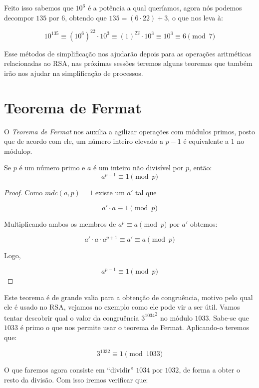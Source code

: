 Feito isso sabemos que $10^6$ \'e a pot\^encia a qual quer\'iamos, agora n\'os podemos decompor $135$ por $6$, obtendo que $135 = (6 \cdot 22) + 3$, o que nos leva \`{a}:

$$10^{135} \equiv (10^6)^{22} \cdot 10^3 \equiv (1)^{22} \cdot 10^3 \equiv 10^3 \equiv 6 \pmod{7}$$

Esse m\'etodos de simplifica\c{c}\~ao nos ajudar\~ao depois para as opera\c{c}\~oes aritm\'eticas relacionadas ao RSA, nas pr\'oximas sess\~oes teremos alguns teoremas que tamb\'em ir\~ao nos ajudar na simplifica\c{c}\~ao de processos.

\section{Teorema de Fermat}

O \textit{Teorema de Fermat} nos auxilia a agilizar opera\c{c}\~oes com m\'odulos primos, posto que de acordo com ele, um n\'umero inteiro elevado a $p-1$ \'e equivalente a $1$ no m\'odulo$p$.

\begin{Th}\label{fermat}
Se $p$ \'e um n\'umero primo e $a$ \'e um inteiro n\~ao divis\'ivel por $p$, ent\~ao:
$$a^{p-1}\equiv 1 \pmod{p}$$
\end{Th}

\begin{proof}
Como $mdc(a,p)=1$ existe um $a'$ tal que

$$a' \cdot a \equiv 1 \pmod{p}$$

Multiplicando ambos os membros de $a^p \equiv a \pmod{p}$ por $a'$ obtemos:

$$a' \cdot a \cdot a^{p+1} \equiv a' \equiv a \pmod{p}$$

Logo,

$$a^{p-1} \equiv 1 \pmod{p}$$
\end{proof}

Este teorema \'e de grande valia para a obten\c{c}\~{a}o de congru\^encia, motivo pelo qual ele \'e usado no RSA, vejamos no exemplo como ele pode vir a ser \'util. Vamos tentar descobrir qual o valor da congru\^encia ${3^{1034}}^{2}$ no m\'odulo $1033$. Sabe-se que $1033$ \'e primo o que nos permite usar o teorema de Fermat. Aplicando-o teremos que:

$$3^{1032} \equiv 1 \pmod{1033}$$

O que faremos agora consiste em ``dividir'' $1034$ por $1032$, de forma a obter o resto da divis\~ao. Com isso iremos verificar que:

